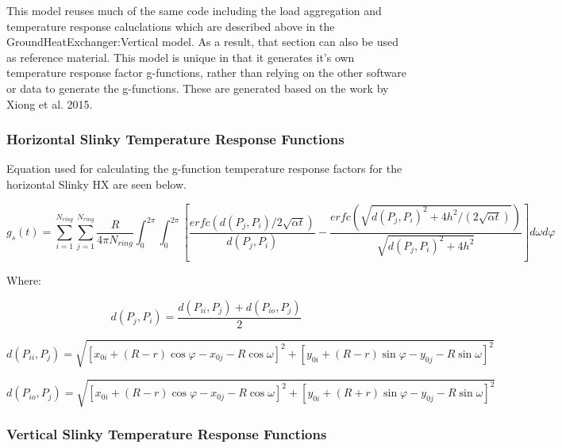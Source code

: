 This model reuses much of the same code including the load aggregation and temperature response caluclations which are described above in the GroundHeatExchanger:Vertical model. As a result, that section can also be used as reference material. This model is unique in that it generates it's own temperature response factor g-functions, rather than relying on the other software or data to generate the g-functions. These are generated based on the work by Xiong et al. 2015.

\subsubsection{Horizontal Slinky Temperature Response Functions}\label{horizontal-slinky-temperature-response-functions}

Equation used for calculating the g-function temperature response factors for the horizontal Slinky HX are seen below.

{\scriptsize
\begin{equation}
g_s\left(t\right) = \sum_{i = 1}^{N_{ring}} \sum_{j = 1}^{N_{ring}} \frac{R}{4\pi N_{ring}} \int_0^{2\pi} \int_0^{2\pi} 
            \left[ 
                \frac{erfc\left(d\left(P_j,P_i\right)/2\sqrt{\alpha t}\right)}{d\left(P_j,P_i\right)} - 
                \frac{erfc\left(\sqrt{d\left(P_j,P_i\right)^2+4h^2/\left(2\sqrt{\alpha t}\right)}\right)}{\sqrt{d\left(P_j,P_i\right)^2+4h^2} }
            \right]d\omega d\varphi
\end{equation}}

Where:

\begin{equation}
d\left(P_j,P_i\right) = \frac{d\left(P_{ii},P_j\right) + d\left(P_{io},P_j\right)}{2}
\end{equation}

\begin{equation}
d\left(P_{ii},P_j\right) = \sqrt{\left[x_{0i} + \left(R-r\right)\cos \varphi - x_{0j}-R\cos \omega\right]^2 + \left[y_{0i} + \left(R-r\right)\sin \varphi - y_{0j}-R\sin \omega\right]^2}
\end{equation}

\begin{equation}
d\left(P_{io},P_j\right) = \sqrt{\left[x_{0i} + \left(R-r\right)\cos \varphi - x_{0j}-R\cos \omega\right]^2 + \left[y_{0i} + \left(R+r\right)\sin \varphi - y_{0j}-R\sin \omega\right]^2}
\end{equation}

\subsubsection{Vertical Slinky Temperature Response Functions}\label{vertical-slinky-temperature-response-functions}

